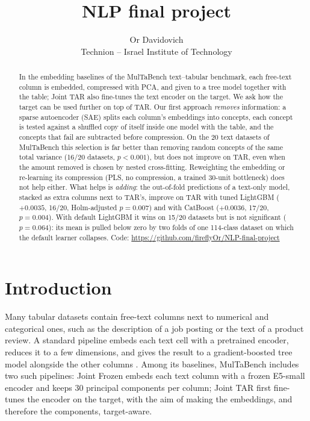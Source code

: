 \documentclass{article}
\title{NLP final project}
\author{Or Davidovich\\Technion -- Israel Institute of Technology}
\begin{document}
\maketitle

\begin{abstract}
In the embedding baselines of the MulTaBench text–tabular benchmark, each free-text column is embedded, compressed with PCA, and given to a tree model together with the table; Joint TAR also fine-tunes the text encoder on the target. We ask how the
target can be used further on top of TAR. Our first approach \emph{removes} information: a sparse autoencoder (SAE)
splits each column's embeddings into concepts, each concept is tested against a shuffled copy of itself inside one
model with the table, and the concepts that fail are subtracted before compression. On the 20
text datasets of MulTaBench this selection is far better than removing random concepts of the same total variance
(16/20 datasets, $p<0.001$), but does not improve on TAR, even when the amount removed is chosen by nested
cross-fitting. Reweighting the embedding or re-learning its compression (PLS, no compression, a trained 30-unit
bottleneck) does not help either. What helps is \emph{adding}: the out-of-fold predictions of a text-only model, stacked as extra columns next
to TAR's, improve on TAR with tuned LightGBM ($+0.0035$, 16/20, Holm-adjusted $p=0.007$) and with CatBoost
($+0.0036$, 17/20, $p=0.004$). With default LightGBM it wins on 15/20 datasets but is not significant ($p=0.064$): its mean is pulled below zero by two folds of one 114-class dataset on which the default learner collapses. Code: \url{https://github.com/fireflyOr/NLP-final-project}
\end{abstract}

\section{Introduction}

Many tabular datasets contain free-text columns next to numerical and categorical ones, such as the description of a job posting or the text of a product review. A standard pipeline embeds each text cell with a pretrained encoder, reduces it to a few dimensions, and gives the result to a
gradient-boosted tree model alongside the other columns \citep{shi2021multimodal,grinsztajn2022tree}. 
Among its baselines, MulTaBench
\citep{multabench} includes two such pipelines: Joint Frozen embeds each text column with a frozen E5-small encoder \citep{wang2022e5} and keeps 30 principal components per column; Joint TAR first fine-tunes the encoder on the target, with the aim of making the embeddings, and therefore the components, target-aware.
\end{document}
